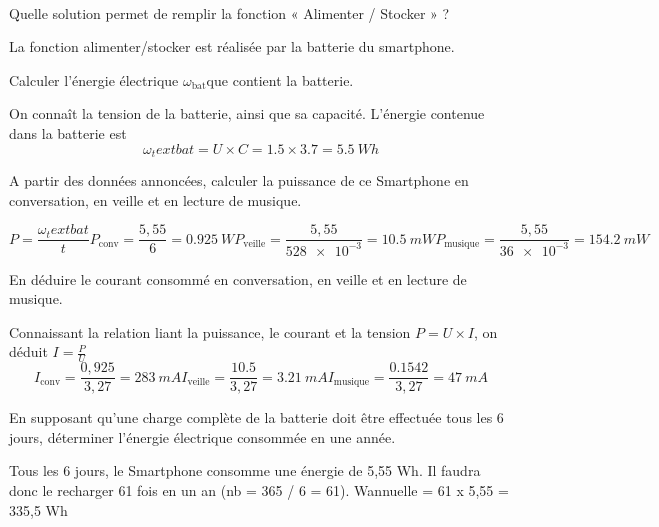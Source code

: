 \documentclass[10pt,fleqn]{article} %
\begin{document}
\begin{exercise}~

\begin{question}
  Quelle solution permet de remplir la fonction « Alimenter / Stocker » ?
\end{question} 
\begin{solution}
  La fonction alimenter/stocker est réalisée par la batterie du smartphone. 
\end{solution}

\begin{question}
  Calculer l’énergie électrique $\omega_\text{bat}$que contient la batterie.
\end{question}
\begin{solution}
  On connaît la tension de la batterie, ainsi que sa capacité. L'énergie 
  contenue dans la batterie est $$\omega_text{bat} = U\times C = 1.5\times 3.7 =\SI{5.5}{Wh} $$
\end{solution}

\begin{question}
  A partir des données annoncées, calculer la puissance de ce Smartphone en 
  conversation, en veille et en lecture de musique. 
\end{question}
\begin{solution}
$$P = \frac{\omega_text{bat}}{t}
P_{\text{conv}} = \frac{5,55}{6} = \SI{0.925}{W}
P_{\text{veille}} = \frac{5,55}{\num{528e-3}} = \SI{10.5}{mW}
P_{\text{musique}} = \frac{5,55}{\num{36e-3}} = \SI{154.2}{mW}$$
\end{solution}

\begin{question}
  En déduire le courant consommé en conversation, en veille et en lecture de musique.
\end{question}
\begin{solution}
  Connaissant la relation liant la puissance, le courant et la tension 
  $P=U\times I$, on déduit $I = \frac{P}{U}$
  $$
 I_{\text{conv}} = \frac{0,925}{3,27} = \SI{283}{mA}
  I_{\text{veille}} = \frac{10.5}{3,27} = \SI{3.21}{mA}
   I_{\text{musique}} = \frac{0.1542}{3,27} = \SI{47}{mA}$$
\end{solution}

\begin{question}
  En supposant qu’une charge complète de la batterie doit être effectuée tous les 6 jours, déterminer l’énergie électrique consommée en une année.
\end{question}
\begin{solution}
  Tous les 6 jours, le Smartphone consomme une énergie de 5,55 Wh.
Il faudra donc le recharger 61 fois en un an (nb = 365 / 6 = 61).
Wannuelle = 61 x 5,55 = 335,5 Wh
\end{solution}

\end{exercise}
\end{document}
